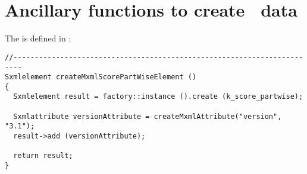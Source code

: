 \section{Ancillary functions to create \mxsrRepr\ data}

The  is defined in :
\begin{lstlisting}[language=CPlusPlus]
//------------------------------------------------------------------------
Sxmlelement createMxmlScorePartWiseElement ()
{
  Sxmlelement result = factory::instance ().create (k_score_partwise);

  Sxmlattribute versionAttribute = createMxmlAttribute("version", "3.1");
  result->add (versionAttribute);

  return result;
}
\end{lstlisting}



